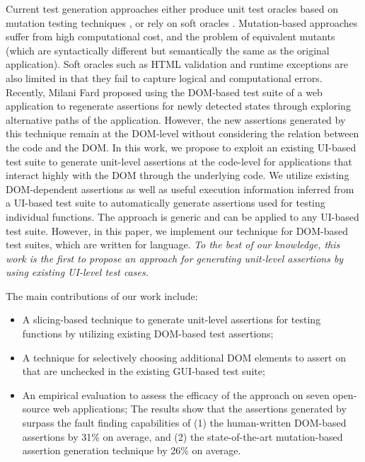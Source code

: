 Current test generation approaches either produce unit test oracles based on mutation testing techniques \cite{mirshokraie:icst15, fraser:tse12}, or rely on soft oracles \cite{artzi:icse11}. Mutation-based approaches suffer from high computational cost, and the problem of equivalent mutants (which are syntactically different but semantically the same as the original application).
Soft oracles such as HTML validation and runtime exceptions are also limited in that they fail to capture logical and computational errors. 
Recently, Milani Fard \etal \cite{milanifard:ase14} proposed using the DOM-based test suite of a web application to regenerate assertions for newly detected states through exploring alternative paths of the application. However, the new assertions generated by this technique remain at the DOM-level without considering the relation between the \javascript code and the DOM.
In this work, we propose to exploit an existing UI-based test suite to generate unit-level assertions at the code-level for applications that interact highly with the DOM through the underlying \javascript code. We utilize
existing DOM-dependent assertions as well as useful execution information inferred from a UI-based test suite to automatically generate assertions used for testing individual \javascript functions.
The approach is generic and can be applied to any UI-based test suite. However, in this paper, we implement our technique for DOM-based test suites, which are written for \javascript language.
{\em To the best of our knowledge, this work is the first to propose an approach for generating unit-level assertions by using existing UI-level test cases.} 

The main contributions of our work include:
\begin{itemize}[noitemsep]
\item A slicing-based technique to generate unit-level assertions for testing \javascript functions by utilizing existing DOM-based test assertions;
\item A technique for selectively choosing additional DOM elements to assert on that are unchecked in the existing GUI-based test suite;
\item An empirical evaluation to assess the efficacy of the approach on seven open-source web applications;
The results show that the assertions generated by \tool surpass the fault finding capabilities of (1) the human-written DOM-based assertions by 31\% on average, and (2) the state-of-the-art mutation-based assertion generation technique by 26\% on average.
\end{itemize} 